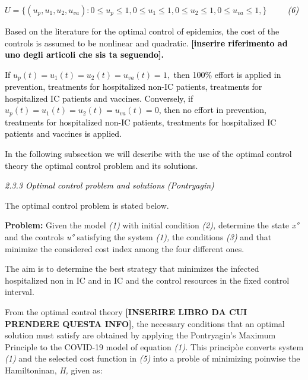 \documentclass[a4paper]{article}
\begin{document}
$U=\{\left(u_p,u_1,u_2,u_{\mathit{va}}\right):0{\leq}u_p{\leq}1,0{\leq}u_1{\leq}1,0{\leq}u_2{\leq}1,0{\leq}u_{\mathit{va}}{\leq}1,\}$\textcolor{black}{\ \ \ \ \ }\textit{\textcolor{black}{(6)}}

\textcolor{black}{Based on the literature for the optimal control of epidemics, the cost of the controls is assumed to
be nonlinear and quadratic. }\textbf{\textcolor{black}{[inserire riferimento ad uno degli articoli che sis ta
seguendo].}}

\textcolor{black}{If } $u_p\left(t\right)=u_1\left(t\right)=u_2\left(t\right)=u_{\mathit{va}}\left(t\right)=1,$
\textcolor{black}{then 100\% effort is applied in prevention, treatments for hospitalized non-IC patients, treatments
for hospitalized IC patients and vaccines. Conversely, if }
$u_p\left(t\right)=u_1\left(t\right)=u_2\left(t\right)=u_{\mathit{va}}\left(t\right)=0$\textcolor{black}{, then no
effort in prevention, treatments for hospitalized non-IC patients, treatments for hospitalized IC patients and vaccines
is applied.}

\textcolor{black}{In the following subsection we will describe with the use of the optimal control theory the optimal
control problem and its solutions. }


\bigskip

\textit{\textcolor{black}{2.3.3 Optimal control problem and solutions (Pontryagin)}}

The optimal control problem is stated below.

\textbf{Problem: }Given the model \textit{(1) }with initial condition \textit{(2), }determine the state \textit{x° }and
the controls \textit{u° }satisfying the system \textit{(1), }the conditions \textit{(3) }and that minimize the
considered cost index among the four different ones.

The aim is to determine the best strategy that minimizes the infected hospitalized non in IC and in IC and the control
resources in the fixed control interval.

From the optimal control theory\textbf{ [INSERIRE LIBRO DA CUI PRENDERE QUESTA INFO]}, the necessary conditions that an
optimal solution must satisfy are obtained by applying the Pontryagin’s Maximum Principle to the COVID-19 model of
equation \textit{(1). }This principòe converts system \textit{(1) }and the selected cost function in \textit{(5) }into
a proble of minimizing poinwise the Hamiltoninan, \textit{H, }given as: 


\bigskip
\end{document}

